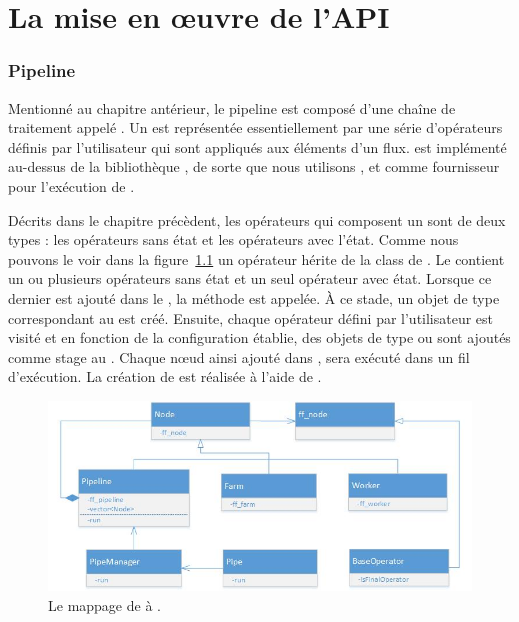 
\chapter{La mise en \oe{}uvre de l'API}
\label{implementation.chap}

\subsection{Pipeline}

Mentionn\'e au chapitre ant\'erieur, le pipeline est compos\'e d'une cha\^ine de traitement appel\'e . Un  est repr\'esent\'ee essentiellement par une s\'erie d'op\'erateurs d\'efinis par l'utilisateur qui sont appliqu\'es aux \'el\'ements d'un flux.  est impl\'ement\'e au-dessus de la biblioth\`eque , de sorte que nous utilisons ,  et  comme fournisseur pour l'ex\'ecution de . 

D\'ecrits dans le chapitre pr\'ec\`edent, les op\'erateurs qui composent un  sont de deux types : les op\'erateurs sans \'etat et les op\'erateurs avec l'\'etat. Comme nous pouvons le voir dans la figure~\ref{MapToFastFlow.fig} un op\'erateur h\'erite de la class  de . Le  contient un ou plusieurs op\'erateurs sans \'etat et un seul op\'erateur avec \'etat. Lorsque ce dernier est ajout\'e dans le , la m\'ethode  est appel\'ee. \`A ce stade, un objet de type  correspondant au  est cr\'e\'e. Ensuite, chaque op\'erateur d\'efini par l'utilisateur est visit\'e et en fonction de la configuration \'etablie, des objets de type  ou  sont ajout\'es comme stage au . Chaque nœud ainsi ajout\'e dans , sera ex\'ecut\'e dans un fil d'ex\'ecution.
La cr\'eation de  est r\'ealis\'ee \`a l'aide de .

\begin{figure}[ht]
\centering
     \includegraphics[width=1.0\textwidth]{Figures/MapToFastFlow.jpg}
      \caption{Le mappage de  \`a .}
       \label{MapToFastFlow.fig}
\end{figure}


